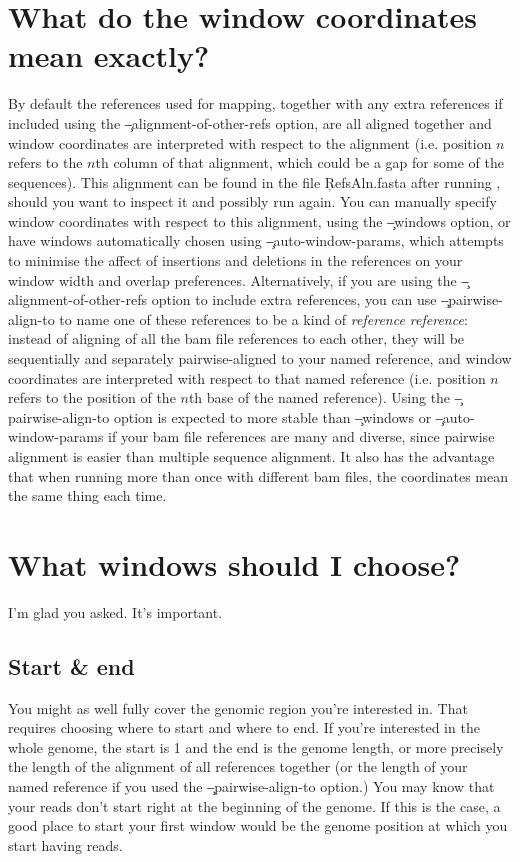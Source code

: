 \section{What do the window coordinates mean exactly?}
By default the references used for mapping, together with any extra references if included using the \c{--alignment-of-other-refs} option, are all aligned together and window coordinates are interpreted with respect to the alignment (i.e. position $n$ refers to the $n$th column of that alignment, which could be a gap for some of the sequences).
This alignment can be found in the file \c{RefsAln.fasta} after running \p, should you want to inspect it and possibly run again.
You can manually specify window coordinates with respect to this alignment, using the \c{--windows} option, or have windows automatically chosen using \c{--auto-window-params}, which attempts to minimise the affect of insertions and deletions in the references on your window width and overlap preferences.
Alternatively, if you are using the \c{--alignment-of-other-refs} option to include extra references, you can use \c{--pairwise-align-to} to name one of these references to be a kind of {\it reference reference}: instead of aligning of all the bam file references to each other, they will be sequentially and separately pairwise-aligned to your named reference, and window coordinates are interpreted with respect to that named reference (i.e. position $n$ refers to the position of the $n$th base of the named reference).
Using the \c{--pairwise-align-to} option is expected to more stable than \c{--windows} or \c{--auto-window-params} if your bam file references are many and diverse, since pairwise alignment is easier than multiple sequence alignment.
It also has the advantage that when running \p more than once with different bam files, the coordinates mean the same thing each time.

\section{What windows should I choose?}
I'm glad you asked.
It's important.

\subsection{Start \& end}

You might as well fully cover the genomic region you're interested in.
That requires choosing where to start and where to end.
If you're interested in the whole genome, the start is 1 and the end is the genome length, or more precisely the length of the alignment of all references together (or the length of your named reference if you used the \c{--pairwise-align-to} option.)
You may know that your reads don't start right at the beginning of the genome.
If this is the case, a good place to start your first window would be the genome position at which you start having reads.

